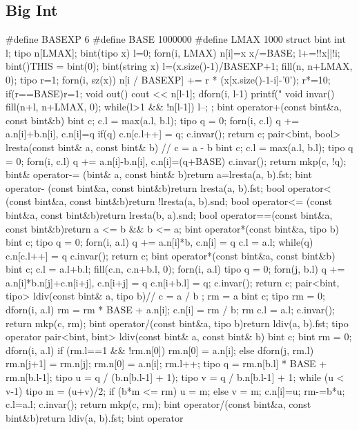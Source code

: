 \documentclass[10pt,landscape,twocolumn,a4paper,notitlepage]{article}
\begin{document}
\subsection{Big Int}
\begin{code}
#define BASEXP 6
#define BASE 1000000
#define LMAX 1000
struct bint{
    int l;
    tipo n[LMAX];
    bint(tipo x){
        l=0;
        forn(i, LMAX){
            n[i]=x%
            x/=BASE;
            l+=!!x||!i;
        }
    }
    bint(){THIS = bint(0);}
    bint(string x){
l=(x.size()-1)/BASEXP+1;
        fill(n, n+LMAX, 0);
        tipo r=1;
        forn(i, sz(x)){
            n[i / BASEXP] += r * (x[x.size()-1-i]-'0');
            r*=10; if(r==BASE)r=1;
        }
    }
    void out(){
		cout << n[l-1];
		dforn(i, l-1) printf("%
	}
	void invar(){
		fill(n+l, n+LMAX, 0);
		while(l>1 && !n[l-1]) l--;
	}
};
bint operator+(const bint&a, const bint&b){
	bint c;
    c.l = max(a.l, b.l);
    tipo q = 0;
    forn(i, c.l) q += a.n[i]+b.n[i], c.n[i]=q %
    if(q) c.n[c.l++] = q;
    c.invar();
    return c;
}
pair<bint, bool> lresta(const bint& a, const bint& b)   // c = a - b
{
	bint c;
    c.l = max(a.l, b.l);
    tipo q = 0;
    forn(i, c.l) q += a.n[i]-b.n[i], c.n[i]=(q+BASE) %
    c.invar();
    return mkp(c, !q);
}
bint& operator-= (bint& a, const bint& b){return a=lresta(a, b).fst;}
bint operator- (const bint&a, const bint&b){return lresta(a, b).fst;}
bool operator< (const bint&a, const bint&b){return !lresta(a, b).snd;}
bool operator<= (const bint&a, const bint&b){return lresta(b, a).snd;}
bool operator==(const bint&a, const bint&b){return a <= b && b <= a;}
bint operator*(const bint&a, tipo b){
    bint c;
    tipo q = 0;
    forn(i, a.l) q += a.n[i]*b, c.n[i] = q %
    c.l = a.l;
    while(q) c.n[c.l++] = q %
    c.invar();
    return c;
}
bint operator*(const bint&a, const bint&b){
    bint c;
    c.l = a.l+b.l;
    fill(c.n, c.n+b.l, 0);
    forn(i, a.l){
        tipo q = 0;
        forn(j, b.l) q += a.n[i]*b.n[j]+c.n[i+j], c.n[i+j] = q %
        c.n[i+b.l] = q;
    }
    c.invar();
    return c;
}
pair<bint, tipo> ldiv(const bint& a, tipo b){// c = a / b ; rm = a %
bint c;
	tipo rm = 0;
dforn(i, a.l){
        		rm = rm * BASE + a.n[i];
        		c.n[i] = rm / b;
        		rm %
    }
    c.l = a.l;
    c.invar();
    return mkp(c, rm);
}
bint operator/(const bint&a, tipo b){return ldiv(a, b).fst;}
tipo operator%
pair<bint, bint> ldiv(const bint& a, const bint& b){
	bint c;
    bint rm = 0;
    dforn(i, a.l){
        if (rm.l==1 && !rm.n[0])
            rm.n[0] = a.n[i];
        else{
            dforn(j, rm.l) rm.n[j+1] = rm.n[j];
            rm.n[0] = a.n[i];
            rm.l++;
        }
        tipo q = rm.n[b.l] * BASE + rm.n[b.l-1];
        tipo u = q / (b.n[b.l-1] + 1);
        tipo v = q /  b.n[b.l-1] + 1;
        while (u < v-1){
            tipo m = (u+v)/2;
            if (b*m <= rm) u = m;
            else v = m;
        }
        c.n[i]=u;
        rm-=b*u;
    }
	c.l=a.l;
    c.invar();
    return mkp(c, rm);
}
bint operator/(const bint&a, const bint&b){return ldiv(a, b).fst;}
bint operator%
\end{code}
\end{document}
